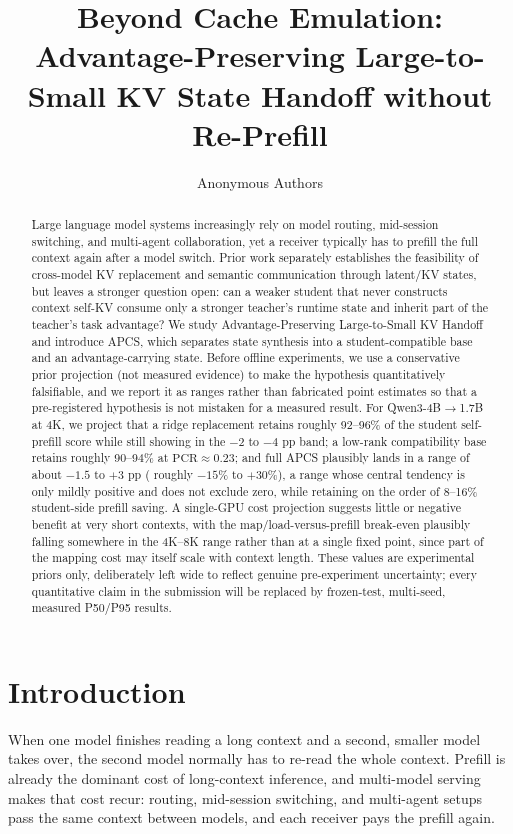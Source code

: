 \documentclass[10pt]{article}
\title{Beyond Cache Emulation: Advantage-Preserving Large-to-Small KV State Handoff without Re-Prefill}
\author{Anonymous Authors}
\date{}
\newcommand{\method}{APCS}
\newcommand{\chg}{\text{CHG}}
\newcommand{\tgrr}{\text{TGRR}}
\newcommand{\pcr}{\text{PCR}}
\begin{document}
\maketitle

\begin{abstract}
Large language model systems increasingly rely on model routing, mid-session switching, and
multi-agent collaboration, yet a receiver typically has to prefill the full context again after a
model switch. Prior work separately establishes the feasibility of cross-model KV replacement and
semantic communication through latent/KV states, but leaves a stronger question open: can a weaker
student that never constructs context self-KV consume only a stronger teacher's runtime state and
inherit part of the teacher's task advantage? We study Advantage-Preserving Large-to-Small KV
Handoff and introduce \method, which separates state synthesis into a student-compatible base and
an advantage-carrying state. Before offline experiments, we use a conservative prior projection
(not measured evidence) to make the hypothesis quantitatively falsifiable, and we report it as
ranges rather than fabricated point estimates so that a pre-registered hypothesis is not mistaken
for a measured result. For Qwen3-4B$\rightarrow$1.7B at 4K, we project that a ridge replacement
retains roughly 92--96\% of the student self-prefill score while still showing \chg{} in the
$-2$ to $-4$ pp band; a low-rank compatibility base retains roughly 90--94\% at $\pcr\approx0.23$;
and full \method{} plausibly lands in a \chg{} range of about $-1.5$ to $+3$ pp
(\tgrr{} roughly $-15\%$ to $+30\%$), a range whose central tendency is only mildly positive and
does not exclude zero, while retaining on the order of 8--16\% student-side prefill saving.
A single-GPU cost projection suggests little or negative benefit at very short contexts, with the
map/load-versus-prefill break-even plausibly falling somewhere in the 4K--8K range rather than at a
single fixed point, since part of the mapping cost may itself scale with context length. These
values are experimental priors only, deliberately left wide to reflect genuine pre-experiment
uncertainty; every quantitative claim in the submission will be replaced by frozen-test, multi-seed,
measured P50/P95 results.
\end{abstract}

\section{Introduction}
When one model finishes reading a long context and a second, smaller model takes over, the second
model normally has to re-read the whole context. Prefill is already the dominant cost of
long-context inference, and multi-model serving makes that cost recur: routing, mid-session
switching, and multi-agent setups pass the same context between models, and each receiver pays the
prefill again.
\end{document}
